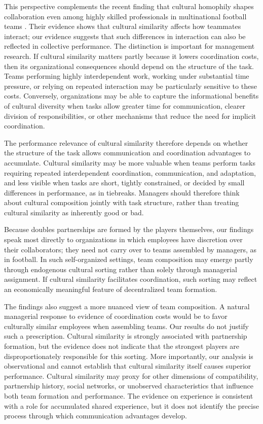 \documentclass[10pt]{article}
\begin{document}
This perspective complements the recent finding that cultural homophily shapes collaboration even among highly skilled professionals in multinational football teams \citep{bekesottaviano2025}. Their evidence shows that cultural similarity affects how teammates interact; our evidence suggests that such differences in interaction can also be reflected in collective performance. The distinction is important for management research. If cultural similarity matters partly because it lowers coordination costs, then its organizational consequences should depend on the structure of the task. Teams performing highly interdependent work, working under substantial time pressure, or relying on repeated interaction may be particularly sensitive to these costs. Conversely, organizations may be able to capture the informational benefits of cultural diversity when tasks allow greater time for communication, clearer division of responsibilities, or other mechanisms that reduce the need for implicit coordination.

The performance relevance of cultural similarity therefore depends on whether the structure of the task allows communication and coordination advantages to accumulate. Cultural similarity may be more valuable when teams perform tasks requiring repeated interdependent coordination, communication, and adaptation, and less visible when tasks are short, tightly constrained, or decided by small differences in performance, as in tiebreaks. Managers should therefore think about cultural composition jointly with task structure, rather than treating cultural similarity as inherently good or bad.

Because doubles partnerships are formed by the players themselves, our findings speak most directly to organizations in which employees have discretion over their collaborators; they need not carry over to teams assembled by managers, as in football. In such self-organized settings, team composition may emerge partly through endogenous cultural sorting rather than solely through managerial assignment. If cultural similarity facilitates coordination, such sorting may reflect an economically meaningful feature of decentralized team formation.

The findings also suggest a more nuanced view of team composition. A natural managerial response to evidence of coordination costs would be to favor culturally similar employees when assembling teams. Our results do not justify such a prescription. Cultural similarity is strongly associated with partnership formation, but the evidence does not indicate that the strongest players are disproportionately responsible for this sorting. More importantly, our analysis is observational and cannot establish that cultural similarity itself causes superior performance. Cultural similarity may proxy for other dimensions of compatibility, partnership history, social networks, or unobserved characteristics that influence both team formation and performance. The evidence on experience is consistent with a role for accumulated shared experience, but it does not identify the precise process through which communication advantages develop.
\end{document}
